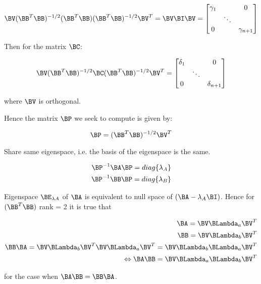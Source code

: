 \begin{equation} \label{eq:A.10}
\BV(\BB^{T}\BB)^{-1/2}(\BB^{T}\BB)(\BB^{T}\BB)^{-1/2}\BV^{T} = \BV\BI\BV = \begin{bmatrix}
\gamma_1 & & 0 \\
 & \ddots & \\
0 & & \gamma_{n+1}
\end{bmatrix}
\end{equation}

Then for the matrix $\BC$:

\begin{equation} \label{eq:A.11}
\BV(\BB^{T}\BB)^{-1/2}\BC(\BB^{T}\BB)^{-1/2}\BV^{T} = \begin{bmatrix}
\delta_1 & & 0 \\
 & \ddots & \\
0 & & \delta_{n+1}
\end{bmatrix}
\end{equation}

where $\BV$ is orthogonal.

Hence the matrix $\BP$ we seek to compute is given by:

\begin{equation} \label{eq:A.12}
\BP = (\BB^T\BB)^{-1/2}\BV^T
\end{equation}

Share same eigenspace, i.e. the basis of the eigenspace is the same.

\begin{eqnarray}
\BP^{-1}\BA\BP = diag\{\lambda_A\} \\
\nonumber
\BP^{-1}\BB\BP = diag\{\lambda_B\}
\end{eqnarray}

Eigenspace $\BE_{\lambda A}$ of $\BA$ is equivalent to null 
space of $(\BA - \lambda_A\BI)$. 
Hence for $(\BB^T\BB)$ rank = 2 it is true
that

\begin{eqnarray}
\BA = \BV\BLambda_a\BV^T \\
\BB = \BV\BLambda_b\BV^T \\
\BB\BA = \BV\BLambda_b\BV^T\BV\BLambda_a\BV^T = \BV\BLambda_b\BLambda_a\BV^T \\
\Leftrightarrow \BA\BB = \BV\BLambda_a\BLambda_b\BV^T
\end{eqnarray}

for the case when $\BA\BB = \BB\BA$.

